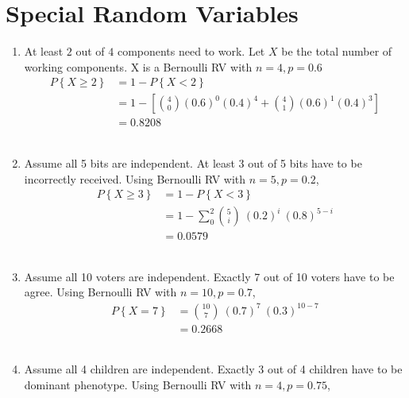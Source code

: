 \chapter{Special Random Variables}

\begin{enumerate}
	\item At least $ 2 $ out of $ 4 $ components need to work. Let $ X $ be the total number of working components. X is a Bernoulli RV with $ n = 4, p = 0.6 $\\
	
	
		\begin{align}
			P \left\{X \geq 2 \right\} &= 1 - P \left\{X < 2 \right\} \\
			&= 1 - \left[\binom{4}{0} (0.6)^0 (0.4)^4 + \binom{4}{1} (0.6)^1 (0.4)^3\right] \nonumber \\
			&= 0.8208 \nonumber
		\end{align}\\
	
	
	\item Assume all 5 bits are independent.  At least 3 out of 5 bits have to be incorrectly received. Using Bernoulli RV with $ n = 5, p = 0.2 $, \\
	
	
		\begin{align}
			P \left\{X \geq 3 \right\} &= 1 - P \left\{X < 3 \right\} \\
			&= 1 - \sum\limits_{0}^{2} \binom{5}{i}\ (0.2)^i\ (0.8)^{5-i} \nonumber \\
			&= 0.0579 \nonumber
		\end{align}\\
	
	
	\item Assume all 10 voters are independent.  Exactly 7 out of 10 voters have to be agree. Using Bernoulli RV with $ n = 10, p = 0.7 $, \\
	
	
		\begin{align}
			P \left\{X = 7 \right\} &= \binom{10}{7}\ (0.7)^7\ (0.3)^{10-7}  \\
			&= 0.2668 \nonumber
		\end{align}\\
	 
	
	\item Assume all 4 children are independent. Exactly 3 out of 4 children have to be dominant phenotype. Using Bernoulli RV with $ n = 4, p = 0.75 $, \\
	

\end{enumerate}
